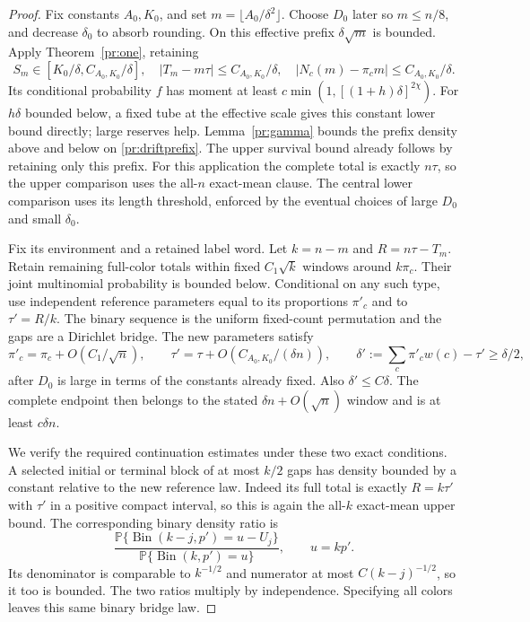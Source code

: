\begin{proof}
Fix constants $A_0,K_0$, and set $m=\lfloor A_0/\delta^2\rfloor$.
Choose $D_0$ later so $m\le n/8$, and decrease $\delta_0$ to absorb
rounding. On this effective prefix $\delta\sqrt m$ is bounded. Apply
Theorem~\ref{pr:one}, retaining
\begin{equation}
 S_m\in[K_0/\delta,C_{A_0,K_0}/\delta],\quad
 |T_m-m\tau|\le C_{A_0,K_0}/\delta,\quad
 |N_c(m)-\pi_cm|\le C_{A_0,K_0}/\delta.                     \label{pr:driftprefix}
\end{equation}
Its conditional probability $f$ has moment at least
$c\min(1,[(1+h)\delta]^{2\chi})$. For $h\delta$ bounded below, a fixed
tube at the effective scale gives this constant lower bound directly;
large reserves help. Lemma~\ref{pr:gamma} bounds the prefix density
above and below on \eqref{pr:driftprefix}. The upper survival bound
already follows by retaining only this prefix.
For this application the complete total is exactly $n\tau$, so the
upper comparison uses the all-$n$ exact-mean clause. The central lower
comparison uses its length threshold, enforced by the eventual choices
of large $D_0$ and small $\delta_0$.

Fix its environment and a retained label word. Let $k=n-m$ and
$R=n\tau-T_m$. Retain remaining full-color totals within fixed
$C_1\sqrt k$ windows around $k\pi_c$. Their joint multinomial probability
is bounded below. Conditional on any such type, use independent reference
parameters equal to its proportions $\pi'_c$ and to $\tau'=R/k$.
The binary sequence is the uniform fixed-count permutation and the gaps
are a Dirichlet bridge. The new parameters satisfy
\[
 \pi'_c=\pi_c+O(C_1/\sqrt n),\qquad
 \tau'=\tau+O(C_{A_0,K_0}/(\delta n)),\qquad
 \delta':=\sum_c\pi'_cw(c)-\tau'\ge\delta/2,
\]
after $D_0$ is large in terms of the constants already fixed. Also
$\delta'\le C\delta$. The complete endpoint then belongs to the stated
$\delta n+O(\sqrt n)$ window and is at least $c\delta n$.

We verify the required continuation estimates under these two exact
conditions. A selected initial or terminal block of at most $k/2$ gaps
has density bounded by a constant relative to the new reference law.
Indeed its full total is exactly $R=k\tau'$ with $\tau'$ in a positive
compact interval, so this is again the all-$k$ exact-mean upper bound.
The corresponding binary density ratio is
\[
 \frac{\mathbb P\{\operatorname{Bin}(k-j,p')=u-U_j\}}
      {\mathbb P\{\operatorname{Bin}(k,p')=u\}},\qquad u=kp'.
\]
Its denominator is comparable to $k^{-1/2}$ and numerator at most
$C(k-j)^{-1/2}$, so it too is bounded. The two ratios multiply by
independence. Specifying all colors leaves this same binary bridge law.


\end{proof}
